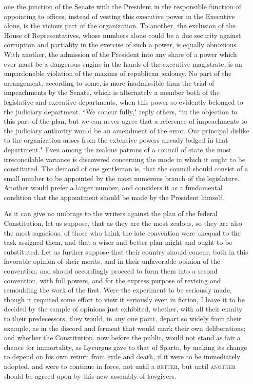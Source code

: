 one the junction of the Senate with the President in the responsible function of appointing to offices, instead of vesting this executive power in the Executive alone, is the vicious part of the organization. To another, the exclusion of the House of Representatives, whose numbers alone could be a due security against corruption and partiality in the exercise of such a power, is equally obnoxious. With another, the admission of the President into any share of a power which ever must be a dangerous engine in the hands of the executive magistrate, is an unpardonable violation of the maxims of republican jealousy. No part of the arrangement, according to some, is more inadmissible than the trial of impeachments by the Senate, which is alternately a member both of the legislative and executive departments, when this power so evidently belonged to the judiciary department. ``We concur fully," reply others, ``in the objection to this part of the plan, but we can never agree that a reference of impeachments to the judiciary authority would be an amendment of the error. Our principal dislike to the organization arises from the extensive powers already lodged in that department." Even among the zealous patrons of a council of state the most irreconcilable variance is discovered concerning the mode in which it ought to be constituted. The demand of one gentleman is, that the council should consist of a small number to be appointed by the most numerous branch of the legislature. Another would prefer a larger number, and considers it as a fundamental condition that the appointment should be made by the President himself.

As it can give no umbrage to the writers against the plan of the federal Constitution, let us suppose, that as they are the most zealous, so they are also the most sagacious, of those who think the late convention were unequal to the task assigned them, and that a wiser and better plan might and ought to be substituted. Let us further suppose that their country should concur, both in this favorable opinion of their merits, and in their unfavorable opinion of the convention; and should accordingly proceed to form them into a second convention, with full powers, and for the express purpose of revising and remoulding the work of the first. Were the experiment to be seriously made, though it required some effort to view it seriously even in fiction, I leave it to be decided by the sample of opinions just exhibited, whether, with all their enmity to their predecessors, they would, in any one point, depart so widely from their example, as in the discord and ferment that would mark their own deliberations; and whether the Constitution, now before the public, would not stand as fair a chance for immortality, as Lycurgus gave to that of Sparta, by making its change to depend on his own return from exile and death, if it were to be immediately adopted, and were to continue in force, not until a \textsc{better}, but until \textsc{another }should be agreed upon by this new assembly of lawgivers.

